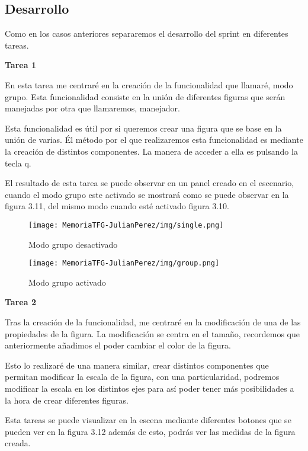 \documentclass[a4paper, 12pt]{book}
\begin{document}
\subsection{Desarrollo}
Como en los casos anteriores separaremos el desarrollo del sprint en diferentes tareas.

\textbf{Tarea 1}

En esta tarea me centraré en la creación de la funcionalidad que llamaré, modo grupo. Esta funcionalidad consiste en la unión de diferentes figuras que serán manejadas por otra que llamaremos, manejador. 

Esta funcionalidad es útil por si queremos crear una figura que se base en la unión de varias. Él método por el que realizaremos esta funcionalidad es mediante la creación de distintos componentes. La manera de acceder a ella es pulsando la tecla q. 

El resultado de esta tarea se puede observar en un panel creado en el escenario, cuando el modo grupo este activado se mostrará como se puede observar en la figura 3.11, del mismo modo cuando esté activado figura 3.10.

\begin{figure}[H]
  \centering
  \begin{minipage}[b]{0.4\textwidth}
 \texttt{[image: MemoriaTFG-JulianPerez/img/single.png]}
  \caption{Modo grupo desactivado}\label{single}
  \end{minipage}
  \hfill
  \begin{minipage}[b]{0.4\textwidth}
  \texttt{[image: MemoriaTFG-JulianPerez/img/group.png]}
  \caption{Modo grupo activado}\label{scrum}
  \end{minipage}
\end{figure}

\textbf{Tarea 2}

Tras la creación de la funcionalidad, me centraré en la modificación de una de las propiedades de la figura. La modificación se centra en el tamaño, recordemos que anteriormente añadimos el poder cambiar el color de la figura.

Esto lo realizaré de una manera similar, crear distintos componentes que permitan modificar la escala de la figura, con una particularidad, podremos modificar la escala en los distintos ejes para así poder tener más posibilidades a la hora de crear diferentes figuras. 

Esta tareas se puede visualizar en la escena mediante diferentes botones que se pueden ver en la figura 3.12 además de esto, podrás ver las medidas de la figura creada.
\end{document}
